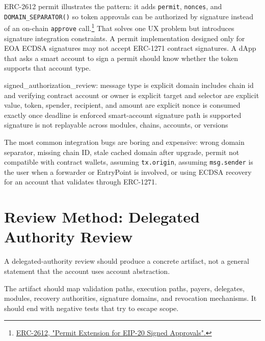 ERC-2612 permit illustrates the pattern: it adds \texttt{permit}, \texttt{nonces}, and \texttt{DOMAIN\_SEPARATOR()} so token approvals can be authorized by signature instead of an on-chain \texttt{approve} call.\footnote{\href{https://eips.ethereum.org/EIPS/eip-2612}{ERC-2612, "Permit Extension for EIP-20 Signed Approvals".}} That solves one UX problem but introduces signature integration constraints. A permit implementation designed only for EOA ECDSA signatures may not accept ERC-1271 contract signatures. A dApp that asks a smart account to sign a permit should know whether the token supports that account type.

\begin{codeblock}
signed_authorization_review:
    message type is explicit
    domain includes chain id and verifying contract
    account or owner is explicit
    target and selector are explicit
    value, token, spender, recipient, and amount are explicit
    nonce is consumed exactly once
    deadline is enforced
    smart-account signature path is supported
    signature is not replayable across modules, chains, accounts, or versions
\end{codeblock}

The most common integration bugs are boring and expensive: wrong domain separator, missing chain ID, stale cached domain after upgrade, permit not compatible with contract wallets, assuming \texttt{tx.origin}, assuming \texttt{msg.sender} is the user when a forwarder or EntryPoint is involved, or using ECDSA recovery for an account that validates through ERC-1271.

\section{Review Method: Delegated Authority Review}

A delegated-authority review should produce a concrete artifact, not a general statement that the account uses account abstraction.

\begin{artifactbox}
The artifact should map validation paths, execution paths, payers, delegates, modules, recovery authorities, signature domains, and revocation mechanisms. It should end with negative tests that try to escape scope.
\end{artifactbox}

